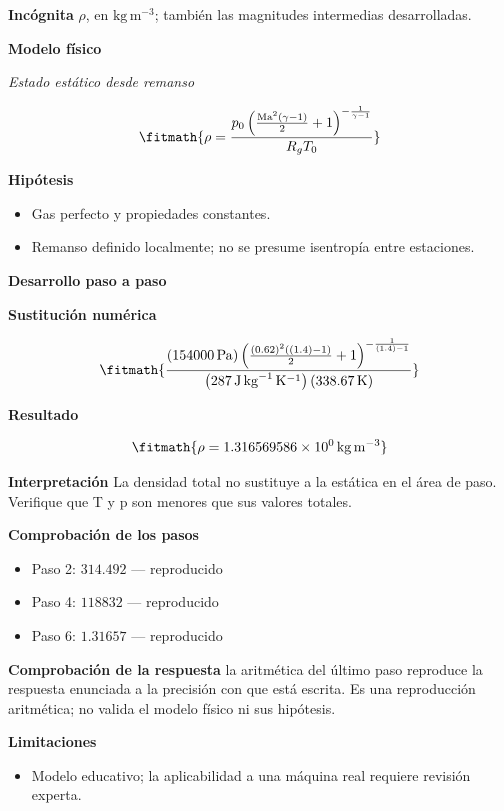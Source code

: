 \documentclass[10pt,openany]{book}
\begin{document}
\noindent\textbf{Incógnita}
$\rho$, en $\mathrm{kg\,m^{-3}}$; también las magnitudes intermedias desarrolladas.

\noindent\textbf{Modelo físico}

\noindent\textit{Estado estático desde remanso}

\[
\fitmath{\rho=\frac{p_0 \left(\frac{\mathrm{Ma}^{2} \left(\gamma - 1\right)}{2} + 1\right)^{- \frac{1}{\gamma - 1}}}{R_g T_0}}
\]

\noindent\textbf{Hipótesis}
\begin{itemize}
\item Gas perfecto y propiedades constantes.
\item Remanso definido localmente; no se presume isentropía entre estaciones.
\end{itemize}

\noindent\textbf{Desarrollo paso a paso}



\noindent\textbf{Sustitución numérica}

\[
\fitmath{\frac{\left(154000\,\mathrm{Pa}\right) \left(\frac{\left(0.62\right)^{2} \left(\left(1.4\right) - 1\right)}{2} + 1\right)^{- \frac{1}{\left(1.4\right) - 1}}}{\left(287\,\mathrm{J}\,\mathrm{kg}^{-1}\,\mathrm{K}^{-1}\right) \left(338.67\,\mathrm{K}\right)}}
\]

\noindent\textbf{Resultado}

\[
\fitmath{\rho=1.316569586\times10^{0}\,\mathrm{kg}\,\mathrm{m}^{-3}}
\]

\noindent\textbf{Interpretación}
La densidad total no sustituye a la estática en el área de paso. Verifique que T y p son menores que sus valores totales.

\noindent\textbf{Comprobación de los pasos}
\begin{itemize}
\item Paso 2: $314.492$ — reproducido
\item Paso 4: $118832$ — reproducido
\item Paso 6: $1.31657$ — reproducido
\end{itemize}

\noindent\textbf{Comprobación de la respuesta} la aritmética del último paso reproduce la respuesta enunciada a la precisión con que está escrita. Es una reproducción aritmética; no valida el modelo físico ni sus hipótesis.

\noindent\textbf{Limitaciones}
\begin{itemize}
\item Modelo educativo; la aplicabilidad a una máquina real requiere revisión experta.
\end{itemize}
\end{document}
